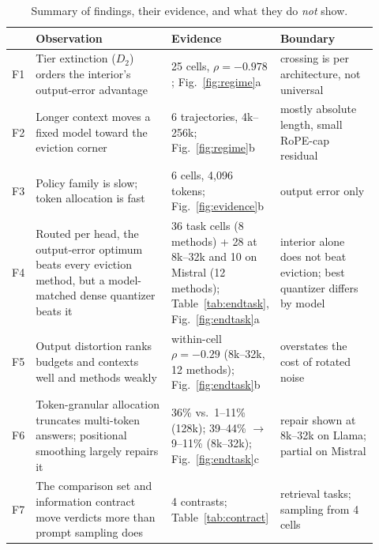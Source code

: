 \documentclass{article}
\theoremstyle{definition}
\begin{document}
\begin{table}[t]
\centering
\small
\setlength{\tabcolsep}{4pt}
\caption{Summary of findings, their evidence, and what they do \emph{not} show.}
\label{tab:findings}
\begin{tabular}{@{}p{0.03\linewidth}p{0.40\linewidth}p{0.20\linewidth}p{0.29\linewidth}@{}}
\toprule
& \textbf{Observation} & \textbf{Evidence} & \textbf{Boundary} \\
\midrule
F1 & Tier extinction ($D_2$) orders the interior's output-error advantage & 25 cells, $\rho=-0.978$; Fig.~\ref{fig:regime}a & crossing is per architecture, not universal \\
F2 & Longer context moves a fixed model toward the eviction corner & 6 trajectories, 4k--256k; Fig.~\ref{fig:regime}b & mostly absolute length, small RoPE-cap residual \\
F3 & Policy family is slow; token allocation is fast & 6 cells, 4,096 tokens; Fig.~\ref{fig:evidence}b & output error only \\
F4 & Routed per head, the output-error optimum beats every eviction method, but a model-matched dense quantizer beats it & 36 task cells (8 methods) + 28 at 8k--32k and 10 on Mistral (12 methods); Table~\ref{tab:endtask}, Fig.~\ref{fig:endtask}a & interior alone does not beat eviction; best quantizer differs by model \\ %
F5 & Output distortion ranks budgets and contexts well and methods weakly & within-cell $\rho=-0.29$ (8k--32k, 12 methods); Fig.~\ref{fig:endtask}b & overstates the cost of rotated noise \\ %
F6 & Token-granular allocation truncates multi-token answers; positional smoothing largely repairs it & 36\% vs.\ 1--11\% (128k); 39--44\% $\to$ 9--11\% (8k--32k); Fig.~\ref{fig:endtask}c & repair shown at 8k--32k on Llama; partial on Mistral \\ %
F7 & The comparison set and information contract move verdicts more than prompt sampling does & 4 contrasts; Table~\ref{tab:contract} & retrieval tasks; sampling from 4 cells \\ %
\bottomrule
\end{tabular}
\vspace{-2mm}
\end{table}
\end{document}
